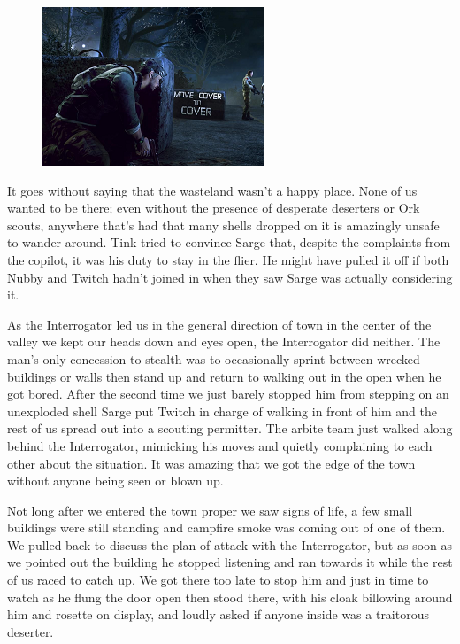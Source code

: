 \begin{figure}
	\begin{center}
		\includegraphics[width=\figwidth]{pics/9/16.png}
	\end{center}
\end{figure}
It goes without saying that the wasteland wasn't a happy place. 
None of us wanted to be there; 
even without the presence of desperate deserters or Ork scouts, anywhere that's had that many shells dropped on it is amazingly unsafe to wander around. 
Tink tried to convince Sarge that, despite the complaints from the copilot, it was his duty to stay in the flier. 
He might have pulled it off if both Nubby and Twitch hadn't joined in when they saw Sarge was actually considering it. 


As the Interrogator led us in the general direction of town in the center of the valley we kept our heads down and eyes open, the Interrogator did neither. 
The man's only concession to stealth was to occasionally sprint between wrecked buildings or walls then stand up and return to walking out in the open when he got bored. 
After the second time we just barely stopped him from stepping on an unexploded shell Sarge put Twitch in charge of walking in front of him and the rest of us spread out into a scouting permitter. 
The arbite team just walked along behind the Interrogator, mimicking his moves and quietly complaining to each other about the situation. 
It was amazing that we got the edge of the town without anyone being seen or blown up.

Not long after we entered the town proper we saw signs of life, a few small buildings were still standing and campfire smoke was coming out of one of them. 
We pulled back to discuss the plan of attack with the Interrogator, but as soon as we pointed out the building he stopped listening and ran towards it while the rest of us raced to catch up. 
We got there too late to stop him and just in time to watch as he flung the door open then stood there, with his cloak billowing around him and rosette on display, and loudly asked if anyone inside was a traitorous deserter.

